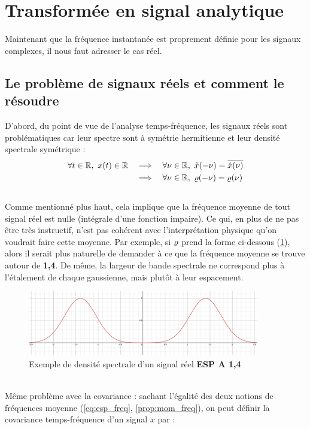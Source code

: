 \section{Transformée en signal analytique}

Maintenant que la fréquence instantanée est proprement définie pour les signaux complexes, il nous faut adresser le cas réel.
\\

\subsection{Le problème de signaux réels et comment le résoudre}\label{sec:transfo_SA}

D'abord, du point de vue de l'analyse temps-fréquence, les signaux réels sont problématiques car leur spectre sont à symétrie hermitienne et leur  densité spectrale symétrique :
\begin{align*}
	\forall t\in\R,\ x(t)\in\R \quad &\Lr \quad \forall \nu\in\R,\ \fou{x}(-\nu) = \congu{\fou{x}(\nu)} \\
	&\Lr \quad \forall \nu\in\R,\ \densis(-\nu) = \densis(\nu)
\end{align*}
\skipl \\
Comme mentionné plus haut, cela implique que la fréquence moyenne de tout signal réel est nulle (intégrale d'une fonction impaire). Ce qui, en plus de ne pas être très instructif, n'est pas cohérent avec l'interprétation physique qu'on voudrait faire cette moyenne. Par exemple, si $\varrho$ prend la forme ci-dessous (\cref{fig:densi_spec_sym}), alors il serait plus naturelle de demander à ce que la fréquence moyenne se trouve autour de \textbf{1,4}. De même, la largeur de bande spectrale ne correspond plus à l'étalement de chaque gaussienne, mais plutôt à leur espacement.
\\
\begin{figure}[h]\centering
	\includegraphics[width=0.9\textwidth]{fig/densi_spec_sym}
	\caption{Exemple de densité spectrale d'un signal réel \textbf{ESP A 1,4}}
	\label{fig:densi_spec_sym}
\end{figure}
\\
Même problème avec la covariance : sachant l'égalité des deux notions de fréquences moyenne (\cref{eq:esp_freq}, \cref{prop:mom_freq}), on peut définir la covariance temps-fréquence d'un signal $x$ par :
